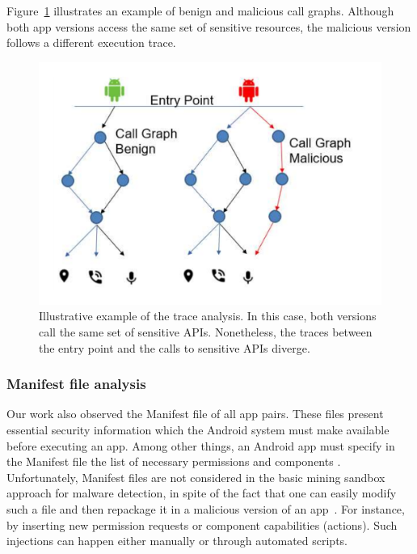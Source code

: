 Figure~\ref{fig:callGraph} illustrates an example of benign and malicious call graphs.
Although both app versions access the same set of sensitive resources, the
malicious version follows a different execution trace. 


\begin{figure}[ht]
\centering
\includegraphics[scale=0.25]{images/maliciousCallGraph.pdf}
\caption{Illustrative example of the trace analysis. In this case, both versions call the same set of sensitive APIs. Nonetheless,
 the traces between the entry point and the calls to sensitive APIs diverge.}
 \label{fig:callGraph}
\end{figure}


\subsubsection{Manifest file analysis}\label{sec:manifestAnalysis}

Our work also observed the Manifest file of all app pairs. These files present essential security information which the Android system must make available before executing an app. Among other things, an Android app must specify in the Manifest file the list of necessary permissions and components . Unfortunately, Manifest files are not considered in the basic mining sandbox approach for malware detection, in spite of the fact that one can easily modify such a file and then repackage it in a malicious version of an app~\cite{DBLP:journals/corr/abs-1208-4536}. For instance, by inserting new permission requests or component capabilities (actions). Such injections can happen either manually or through automated scripts.

